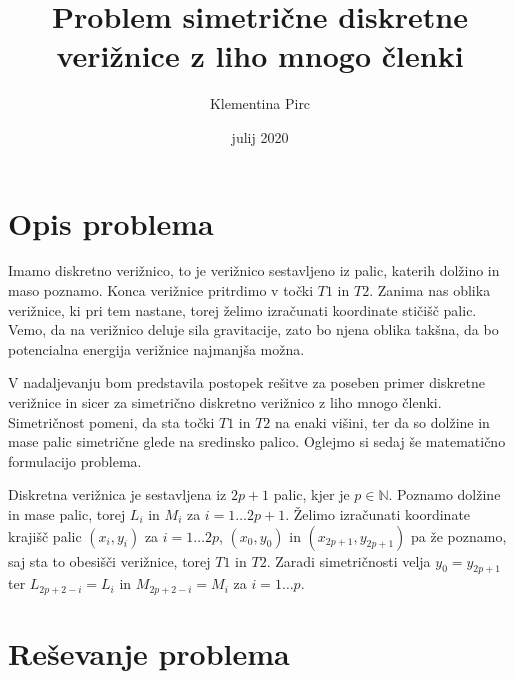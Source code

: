 \documentclass[A4paper, 11pt]{article}
\title{Problem simetrične diskretne verižnice z liho mnogo členki}
\author{Klementina Pirc}
\affil{Fakulteta za matematiko in fiziko \\ Oddelek za matematiko}
\date{julij 2020}
\begin{document}
\begin{titlepage} 

\maketitle
\thispagestyle{empty}
	
\end{titlepage}



\section{Opis problema}

Imamo diskretno verižnico, to je verižnico sestavljeno iz palic, katerih dolžino in maso poznamo. Konca verižnice pritrdimo v točki $T1$ in $T2$. Zanima nas oblika verižnice, ki pri tem nastane, torej želimo izračunati koordinate stičišč palic. Vemo, da na verižnico deluje sila gravitacije, zato bo njena oblika takšna, da bo potencialna energija verižnice najmanjša možna. 


V nadaljevanju bom predstavila postopek rešitve za poseben primer diskretne verižnice in sicer za simetrično diskretno verižnico z liho mnogo členki. Simetričnost pomeni, da sta točki $T1$ in $T2$ na enaki višini, ter da so dolžine in mase palic simetrične glede na sredinsko palico. Oglejmo si sedaj še matematično formulacijo problema.

Diskretna verižnica je sestavljena iz $2p+1$ palic, kjer je $p \in \mathbb{N}$. Poznamo dolžine in mase palic, torej $L_i$ in $M_i$ za $i=1 \ldots 2p+1$. Želimo izračunati koordinate krajišč palic $(x_i,y_i)$ za $i=1 \ldots 2p$, $(x_0,y_0)$ in $(x_{2p+1},y_{2p+1})$ pa že poznamo, saj sta to obesišči verižnice, torej $T1$ in $T2$. Zaradi simetričnosti velja $y_0 = y_{2p+1}$ ter $L_{2p+2-i} = L_i$ in $M_{2p+2-i} = M_i$ za $i=1 \ldots p$.




\section{Reševanje problema}
\end{document}

